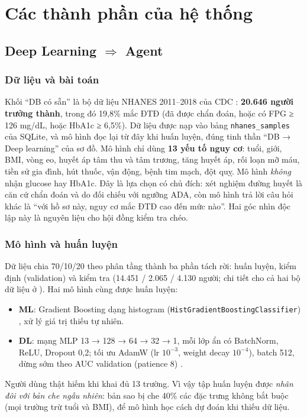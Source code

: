 \chapter{Các thành phần của hệ thống}
\label{chap:comp}

\section{\texorpdfstring{Deep Learning $\Rightarrow$ Agent}{Deep Learning => Agent}}
\label{sec:dl}

\subsection{Dữ liệu và bài toán}

Khối ``DB có sẵn'' là bộ dữ liệu NHANES 2011–2018 của CDC \cite{nhanes}: \textbf{20.646 người trưởng thành}, trong đó 19,8\% mắc ĐTĐ (đã được chẩn đoán, hoặc có FPG ≥ 126 mg/dL, hoặc HbA1c ≥ 6,5\%). Dữ liệu được nạp vào bảng \texttt{nhanes\_samples} của SQLite, và mô hình đọc lại từ đây khi huấn luyện, đúng tinh thần ``DB → Deep learning'' của sơ đồ. Mô hình chỉ dùng \textbf{13 yếu tố nguy cơ}: tuổi, giới, BMI, vòng eo, huyết áp tâm thu và tâm trương, tăng huyết áp, rối loạn mỡ máu, tiền sử gia đình, hút thuốc, vận động, bệnh tim mạch, đột quỵ. Mô hình \emph{không} nhận glucose hay HbA1c. Đây là lựa chọn có chủ đích: xét nghiệm đường huyết là căn cứ chẩn đoán và do  đối chiếu với ngưỡng ADA, còn mô hình trả lời câu hỏi khác là ``với hồ sơ này, nguy cơ mắc ĐTĐ cao đến mức nào''. Hai góc nhìn độc lập này là nguyên liệu cho hội đồng kiểm tra chéo.

\subsection{Mô hình và huấn luyện}

Dữ liệu chia 70/10/20 theo phân tầng thành ba phần tách rời: huấn luyện, kiểm định (validation) và kiểm tra (14.451 / 2.065 / 4.130 người; chi tiết cho cả hai bộ dữ liệu ở ). Hai mô hình cùng được huấn luyện:
\begin{itemize}
  \item \textbf{ML}: Gradient Boosting dạng histogram (\texttt{HistGradientBoostingClassifier}) \cite{friedman2001,ke2017}, xử lý giá trị thiếu tự nhiên.
  \item \textbf{DL}: mạng MLP 13 → 128 → 64 → 32 → 1, mỗi lớp ẩn có BatchNorm, ReLU, Dropout 0,2; tối ưu AdamW (lr $10^{-3}$, weight decay $10^{-4}$), batch 512, dừng sớm theo AUC validation (patience 8) \cite{paszke2019,goodfellow2016}.
\end{itemize}
Người dùng thật hiếm khi khai đủ 13 trường. Vì vậy tập huấn luyện được \emph{nhân đôi với bản che ngẫu nhiên}: bản sao bị che 40\% các đặc trưng không bắt buộc (mọi trường trừ tuổi và BMI), để mô hình học cách dự đoán khi thiếu dữ liệu.

